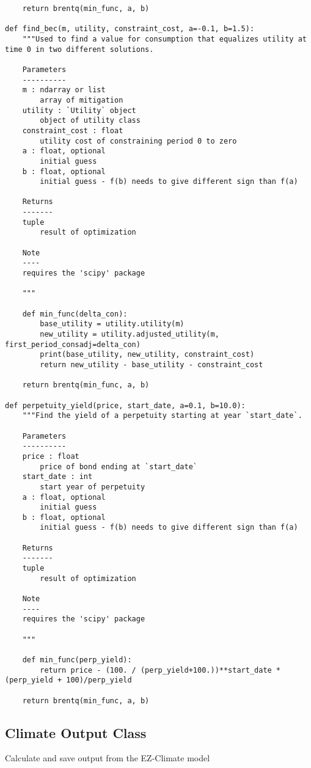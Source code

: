 \documentclass[12pt]{article}
\begin{document}
\begin{verbatim}
	return brentq(min_func, a, b)

def find_bec(m, utility, constraint_cost, a=-0.1, b=1.5):
	"""Used to find a value for consumption that equalizes utility at time 0 in two different solutions.

	Parameters
	----------
	m : ndarray or list
		array of mitigation
	utility : `Utility` object
		object of utility class
	constraint_cost : float
		utility cost of constraining period 0 to zero
	a : float, optional
		initial guess
	b : float, optional
		initial guess - f(b) needs to give different sign than f(a)
	
	Returns
	-------
	tuple
		result of optimization

	Note
	----
	requires the 'scipy' package

	"""

	def min_func(delta_con):
		base_utility = utility.utility(m)
		new_utility = utility.adjusted_utility(m, first_period_consadj=delta_con)
		print(base_utility, new_utility, constraint_cost)
		return new_utility - base_utility - constraint_cost

	return brentq(min_func, a, b)

def perpetuity_yield(price, start_date, a=0.1, b=10.0):
	"""Find the yield of a perpetuity starting at year `start_date`.

	Parameters
	----------
	price : float
		price of bond ending at `start_date`
	start_date : int
		start year of perpetuity
	a : float, optional
		initial guess
	b : float, optional
		initial guess - f(b) needs to give different sign than f(a)
	
	Returns
	-------
	tuple
		result of optimization

	Note
	----
	requires the 'scipy' package

	"""
	
	def min_func(perp_yield):
		return price - (100. / (perp_yield+100.))**start_date * (perp_yield + 100)/perp_yield

	return brentq(min_func, a, b)
\end{verbatim}

\subsection{Climate Output Class}
Calculate and save output from the EZ-Climate model
\end{document}
